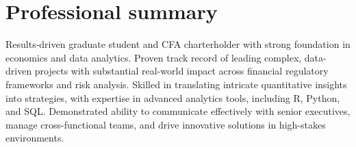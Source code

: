 \section{Professional summary}
Results-driven graduate student and CFA charterholder with strong foundation in economics and data analytics. Proven track record of leading complex, data-driven projects with substantial real-world impact across financial regulatory frameworks and risk analysis. Skilled in translating intricate quantitative insights into strategies, with expertise in advanced analytics tools, including R, Python, and SQL. Demonstrated ability to communicate effectively with senior executives, manage cross-functional teams, and drive innovative solutions in high-stakes environments. 

